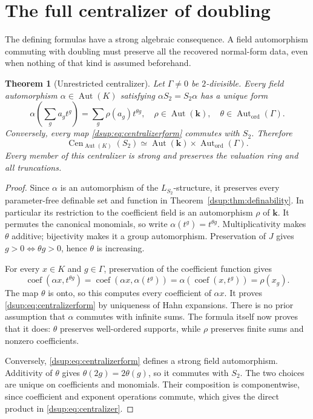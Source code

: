 \documentclass[11pt,oneside]{article}
\numberwithin{equation}{section}
\newtheorem{theorem}{Theorem}[section]
\theoremstyle{definition}
\theoremstyle{remark}
\newcommand{\kk}{\mathbf k}
\newcommand{\Aut}{\operatorname{Aut}}
\newcommand{\coef}{\operatorname{coef}}
\DeclareMathOperator{\Cen}{Cen}
\begin{document}
\section{The full centralizer of doubling}\label{dsup:sec:centralizer}

The defining formulas have a strong algebraic consequence. A field
automorphism commuting with doubling must preserve all the recovered
normal-form data, even when nothing of that kind is assumed beforehand.

\begin{theorem}[Unrestricted centralizer]\label{dsup:thm:centralizer}
Let $\Gamma\ne0$ be $2$-divisible. Every field automorphism
$\alpha\in\Aut(K)$ satisfying $\alpha S_2=S_2\alpha$ has a unique form
\begin{equation}\label{dsup:eq:centralizerform}
 \alpha\left(\sum_g a_gt^g\right)
       =\sum_g\rho(a_g)t^{\theta g},
 \quad \rho\in\Aut(\kk),\quad
       \theta\in\Aut_{\mathrm{ord}}(\Gamma).
\end{equation}
Conversely, every map \eqref{dsup:eq:centralizerform} commutes with $S_2$.
Therefore
\begin{equation}\label{dsup:eq:centralizer}
 \Cen_{\Aut(K)}(S_2)
     \simeq\Aut(\kk)\times\Aut_{\mathrm{ord}}(\Gamma).
\end{equation}
Every member of this centralizer is strong and preserves the valuation
ring and all truncations.
\end{theorem}
\begin{proof}
Since $\alpha$ is an automorphism of the $L_{S_2}$-structure, it preserves
every parameter-free definable set and function in
Theorem~\ref{dsup:thm:definability}. In particular its restriction to the
coefficient field is an automorphism $\rho$ of $\kk$.
It permutes the canonical monomials, so write
$\alpha(t^g)=t^{\theta g}$. Multiplicativity makes $\theta$ additive;
bijectivity makes it a group automorphism. Preservation of $J$ gives
$g>0\Longleftrightarrow\theta g>0$, hence $\theta$ is increasing.

For every $x\in K$ and $g\in\Gamma$, preservation of the coefficient
function gives
\[
 \coef(\alpha x,t^{\theta g})
 =\coef(\alpha x,\alpha(t^g))
 =\alpha(\coef(x,t^g))=\rho(x_g).
\]
The map $\theta$ is onto, so this computes every coefficient of $\alpha x$.
It proves \eqref{dsup:eq:centralizerform} by uniqueness of Hahn expansions.
There is no prior assumption that $\alpha$ commutes with infinite sums.
The formula itself now proves that it does: $\theta$ preserves
well-ordered supports, while $\rho$ preserves finite sums and nonzero
coefficients.

Conversely, \eqref{dsup:eq:centralizerform} defines a strong field automorphism.
Additivity of $\theta$ gives $\theta(2g)=2\theta(g)$, so it commutes with
$S_2$. The two choices are unique on coefficients and monomials. Their
composition is componentwise, since coefficient and exponent operations
commute, which gives the direct product in \eqref{dsup:eq:centralizer}.
\end{proof}
\end{document}
